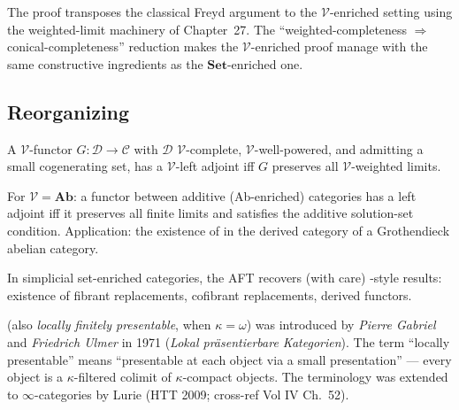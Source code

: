 \begin{remark}
The proof transposes the classical Freyd argument to the $\mathcal{V}$-enriched
setting using the weighted-limit machinery of Chapter~27. The
``weighted-completeness $\Rightarrow$ conical-completeness'' reduction
makes the $\mathcal{V}$-enriched proof manage with the same constructive
ingredients as the $\mathbf{Set}$-enriched one.
\end{remark}

\subsection{Reorganizing}

\begin{theorem}
\label{thm:enriched-saft}
A $\mathcal{V}$-functor $G : \mathcal{D} \to \mathcal{C}$ with $\mathcal{D}$
$\mathcal{V}$-complete, $\mathcal{V}$-well-powered, and admitting a small
cogenerating set, has a $\mathcal{V}$-left adjoint iff $G$ preserves all
$\mathcal{V}$-weighted limits.
\end{theorem}

\begin{example_thm}
For $\mathcal{V} = \mathbf{Ab}$: a functor between additive (Ab-enriched)
categories has a left adjoint iff it preserves all finite limits and
satisfies the additive solution-set condition. Application: the existence
of  in the derived category of a Grothendieck abelian
category.
\end{example_thm}

\begin{example_thm}
In simplicial set-enriched categories, the AFT recovers (with care)
-style results: existence of fibrant
replacements, cofibrant replacements, derived functors.
\end{example_thm}


\begin{nameorigin}
 (also \emph{locally finitely
presentable}, when $\kappa = \omega$) was introduced by
\emph{Pierre Gabriel} and \emph{Friedrich Ulmer} in 1971
(\emph{Lokal präsentierbare Kategorien}). The term ``locally
presentable'' means ``presentable at each object via a small
presentation'' — every object is a $\kappa$-filtered colimit of
$\kappa$-compact objects. The terminology was extended to
$\infty$-categories by Lurie (HTT 2009; cross-ref Vol IV Ch.~52).
\end{nameorigin}

